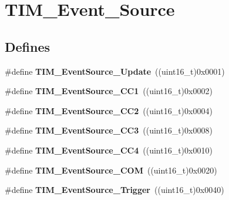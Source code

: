 \hypertarget{group__TIM__Event__Source}{
\section{TIM\_\-Event\_\-Source}
\label{group__TIM__Event__Source}
}
\subsection*{Defines}
\begin{DoxyCompactItemize}
\item 
\hypertarget{group__TIM__Event__Source_ga5bff72fbe94b1ae5a710e402c9868b23}{
\#define {\bfseries TIM\_\-EventSource\_\-Update}~((uint16\_\-t)0x0001)}
\label{group__TIM__Event__Source_ga5bff72fbe94b1ae5a710e402c9868b23}

\item 
\hypertarget{group__TIM__Event__Source_gaa634c46d4ac521ad16e25be97b487e8a}{
\#define {\bfseries TIM\_\-EventSource\_\-CC1}~((uint16\_\-t)0x0002)}
\label{group__TIM__Event__Source_gaa634c46d4ac521ad16e25be97b487e8a}

\item 
\hypertarget{group__TIM__Event__Source_ga5e2082a09552acc9c7e9577f104ba15a}{
\#define {\bfseries TIM\_\-EventSource\_\-CC2}~((uint16\_\-t)0x0004)}
\label{group__TIM__Event__Source_ga5e2082a09552acc9c7e9577f104ba15a}

\item 
\hypertarget{group__TIM__Event__Source_gafeb8538e3b00d938e061e5051f83836b}{
\#define {\bfseries TIM\_\-EventSource\_\-CC3}~((uint16\_\-t)0x0008)}
\label{group__TIM__Event__Source_gafeb8538e3b00d938e061e5051f83836b}

\item 
\hypertarget{group__TIM__Event__Source_gab60e3190e6c09d2d067f2c689d614979}{
\#define {\bfseries TIM\_\-EventSource\_\-CC4}~((uint16\_\-t)0x0010)}
\label{group__TIM__Event__Source_gab60e3190e6c09d2d067f2c689d614979}

\item 
\hypertarget{group__TIM__Event__Source_ga4c06981037fae91786f966aa9b4b3435}{
\#define {\bfseries TIM\_\-EventSource\_\-COM}~((uint16\_\-t)0x0020)}
\label{group__TIM__Event__Source_ga4c06981037fae91786f966aa9b4b3435}

\item 
\hypertarget{group__TIM__Event__Source_ga24835bf5eac25eed90069208dce22564}{
\#define {\bfseries TIM\_\-EventSource\_\-Trigger}~((uint16\_\-t)0x0040)}
\label{group__TIM__Event__Source_ga24835bf5eac25eed90069208dce22564}


\end{DoxyCompactItemize}
